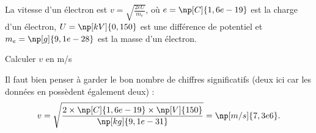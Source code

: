 \begin{enonce}
\end{enonce}




\finEntrainement








\hauteurLargeurCadreReponse		{10mm}{6cm}
\initialisationEntrainement

La vitesse d'un électron est $v=\sqrt{\frac{2eU}{m_e}}$, où $e=\np[C]{1,6e-19}$ est la charge d'un électron, $U=\np[kV]{0,150}$ est une différence de potentiel et $m_e=\np[g]{9,1e-28}$ est la masse d'un électron.

\debutEntrainement


\begin{enonce}
Calculer $v$ en m/s
\end{enonce}


\begin{corrige}
Il faut bien penser à garder le bon nombre de chiffres significatifs 
(deux ici car les données en possèdent également deux) : \vspace{-2mm}
\[
v=\sqrt{\frac{2\times \np[C]{1,6e-19} \times \np[V]{150}}{\np[kg]{9,1e-31}}} = \np[m/s]{7,3e6}.
\]
\end{corrige}

